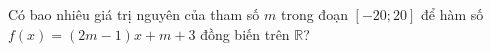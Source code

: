 \begin{ex}
Có bao nhiêu giá trị nguyên của tham số $m$ trong đoạn $[-20;20]$ để hàm số $f(x)=(2m-1)x+m+3$ đồng biến trên $\mathbb R$?
\end{ex}
